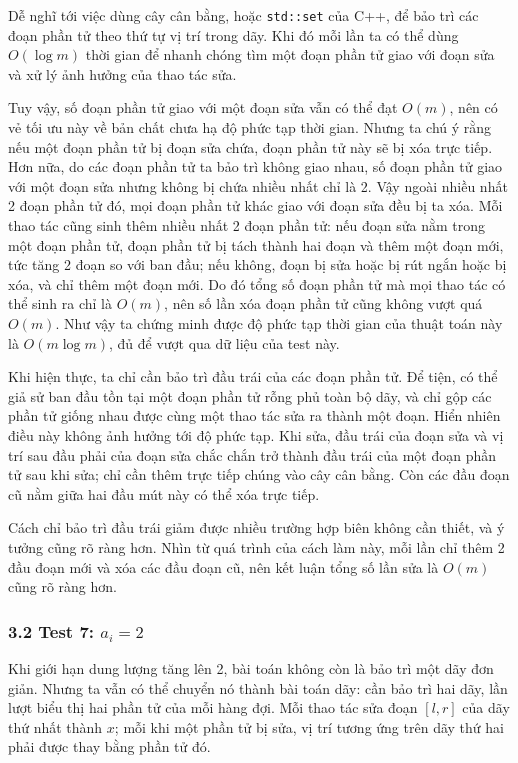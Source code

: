 \documentclass[11pt]{article}
\begin{document}
Dễ nghĩ tới việc dùng cây cân bằng, hoặc \texttt{std::set} của C++, để bảo trì
các đoạn phần tử theo thứ tự vị trí trong dãy. Khi đó mỗi lần ta có thể dùng
\(O(\log m)\) thời gian để nhanh chóng tìm một đoạn phần tử giao với đoạn sửa và
xử lý ảnh hưởng của thao tác sửa.

Tuy vậy, số đoạn phần tử giao với một đoạn sửa vẫn có thể đạt \(O(m)\), nên có
vẻ tối ưu này về bản chất chưa hạ độ phức tạp thời gian. Nhưng ta chú ý rằng
nếu một đoạn phần tử bị đoạn sửa chứa, đoạn phần tử này sẽ bị xóa trực tiếp.
Hơn nữa, do các đoạn phần tử ta bảo trì không giao nhau, số đoạn phần tử giao
với một đoạn sửa nhưng không bị chứa nhiều nhất chỉ là 2. Vậy ngoài nhiều nhất 2
đoạn phần tử đó, mọi đoạn phần tử khác giao với đoạn sửa đều bị ta xóa. Mỗi thao
tác cũng sinh thêm nhiều nhất 2 đoạn phần tử: nếu đoạn sửa nằm trong một đoạn
phần tử, đoạn phần tử bị tách thành hai đoạn và thêm một đoạn mới, tức tăng 2
đoạn so với ban đầu; nếu không, đoạn bị sửa hoặc bị rút ngắn hoặc bị xóa, và chỉ
thêm một đoạn mới. Do đó tổng số đoạn phần tử mà mọi thao tác có thể sinh ra chỉ
là \(O(m)\), nên số lần xóa đoạn phần tử cũng không vượt quá \(O(m)\). Như vậy
ta chứng minh được độ phức tạp thời gian của thuật toán này là \(O(m\log m)\),
đủ để vượt qua dữ liệu của test này.

Khi hiện thực, ta chỉ cần bảo trì đầu trái của các đoạn phần tử. Để tiện, có thể
giả sử ban đầu tồn tại một đoạn phần tử rỗng phủ toàn bộ dãy, và chỉ gộp các
phần tử giống nhau được cùng một thao tác sửa ra thành một đoạn. Hiển nhiên điều
này không ảnh hưởng tới độ phức tạp. Khi sửa, đầu trái của đoạn sửa và vị trí
sau đầu phải của đoạn sửa chắc chắn trở thành đầu trái của một đoạn phần tử sau
khi sửa; chỉ cần thêm trực tiếp chúng vào cây cân bằng. Còn các đầu đoạn cũ nằm
giữa hai đầu mút này có thể xóa trực tiếp.

Cách chỉ bảo trì đầu trái giảm được nhiều trường hợp biên không cần thiết, và ý
tưởng cũng rõ ràng hơn. Nhìn từ quá trình của cách làm này, mỗi lần chỉ thêm 2
đầu đoạn mới và xóa các đầu đoạn cũ, nên kết luận tổng số lần sửa là \(O(m)\)
cũng rõ ràng hơn.

\subsubsection*{3.2 Test 7: \(a_i=2\)}

Khi giới hạn dung lượng tăng lên 2, bài toán không còn là bảo trì một dãy đơn
giản. Nhưng ta vẫn có thể chuyển nó thành bài toán dãy: cần bảo trì hai dãy, lần
lượt biểu thị hai phần tử của mỗi hàng đợi. Mỗi thao tác sửa đoạn \([l,r]\) của
dãy thứ nhất thành \(x\); mỗi khi một phần tử bị sửa, vị trí tương ứng trên dãy
thứ hai phải được thay bằng phần tử đó.
\end{document}
